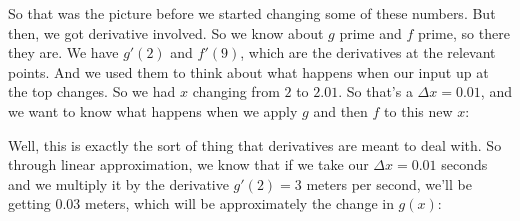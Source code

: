 \documentclass[pdftex, brazil, 12pt, twoside]{article}
\begin{document}
So that was the picture before we started
changing some of these numbers.
But then, we got derivative involved.
So we know about $g$ prime and $f$ prime, so there they are.
We have $g'(2)$ and $f'(9)$,
which are the derivatives at the relevant points.
And we used them to think about what happens when our input up
at the top changes.
So we had $x$ changing from $2$ to $2.01$.
So that's a $\Delta x = 0.01$, and we
want to know what happens when we apply $g$ and then
$f$ to this new $x$:

\begin{figure}[H]
  \begin{center}
  \end{center}
\end{figure}

Well, this is exactly the sort of thing
that derivatives are meant to deal with.
So through linear approximation, we
know that if we take our $\Delta x = 0.01$ seconds
and we multiply it by the derivative $g'(2) = 3$ meters per second,
we'll be getting $0.03$ meters, which will be approximately
the change in $g(x)$:

\begin{figure}[H]
  \begin{center}
  \end{center}
\end{figure}
\end{document}

